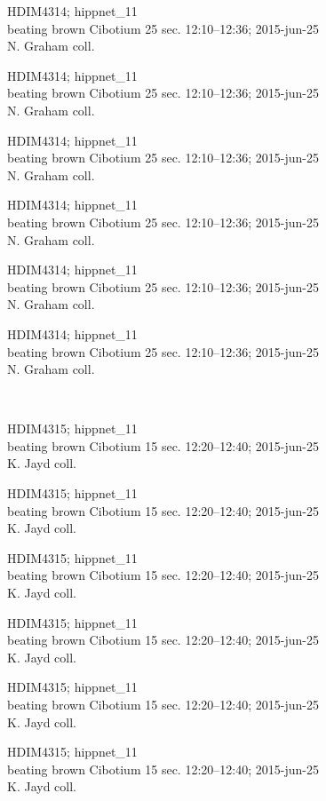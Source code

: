 \documentclass[2pt]{extarticle}
\begin{document}
\noindent
\parbox{0.16\textwidth}{\tiny \raggedright \rule[-0.3\baselineskip]{0pt}{10pt}HDIM4314; hippnet\_11\\ beating brown Cibotium 25 sec. 12:10--12:36; 2015-jun-25\\ N. Graham coll.}
\parbox{0.16\textwidth}{\tiny \raggedright \rule[-0.3\baselineskip]{0pt}{10pt}HDIM4314; hippnet\_11\\ beating brown Cibotium 25 sec. 12:10--12:36; 2015-jun-25\\ N. Graham coll.}
\parbox{0.16\textwidth}{\tiny \raggedright \rule[-0.3\baselineskip]{0pt}{10pt}HDIM4314; hippnet\_11\\ beating brown Cibotium 25 sec. 12:10--12:36; 2015-jun-25\\ N. Graham coll.}
\parbox{0.16\textwidth}{\tiny \raggedright \rule[-0.3\baselineskip]{0pt}{10pt}HDIM4314; hippnet\_11\\ beating brown Cibotium 25 sec. 12:10--12:36; 2015-jun-25\\ N. Graham coll.}
\parbox{0.16\textwidth}{\tiny \raggedright \rule[-0.3\baselineskip]{0pt}{10pt}HDIM4314; hippnet\_11\\ beating brown Cibotium 25 sec. 12:10--12:36; 2015-jun-25\\ N. Graham coll.}
\parbox{0.16\textwidth}{\tiny \raggedright \rule[-0.3\baselineskip]{0pt}{10pt}HDIM4314; hippnet\_11\\ beating brown Cibotium 25 sec. 12:10--12:36; 2015-jun-25\\ N. Graham coll.} \\ 
\vspace{0.001in} 

\noindent
\parbox{0.16\textwidth}{\tiny \raggedright \rule[-0.3\baselineskip]{0pt}{10pt}HDIM4315; hippnet\_11\\ beating brown Cibotium 15 sec. 12:20--12:40; 2015-jun-25\\ K. Jayd coll.}
\parbox{0.16\textwidth}{\tiny \raggedright \rule[-0.3\baselineskip]{0pt}{10pt}HDIM4315; hippnet\_11\\ beating brown Cibotium 15 sec. 12:20--12:40; 2015-jun-25\\ K. Jayd coll.}
\parbox{0.16\textwidth}{\tiny \raggedright \rule[-0.3\baselineskip]{0pt}{10pt}HDIM4315; hippnet\_11\\ beating brown Cibotium 15 sec. 12:20--12:40; 2015-jun-25\\ K. Jayd coll.}
\parbox{0.16\textwidth}{\tiny \raggedright \rule[-0.3\baselineskip]{0pt}{10pt}HDIM4315; hippnet\_11\\ beating brown Cibotium 15 sec. 12:20--12:40; 2015-jun-25\\ K. Jayd coll.}
\parbox{0.16\textwidth}{\tiny \raggedright \rule[-0.3\baselineskip]{0pt}{10pt}HDIM4315; hippnet\_11\\ beating brown Cibotium 15 sec. 12:20--12:40; 2015-jun-25\\ K. Jayd coll.}
\parbox{0.16\textwidth}{\tiny \raggedright \rule[-0.3\baselineskip]{0pt}{10pt}HDIM4315; hippnet\_11\\ beating brown Cibotium 15 sec. 12:20--12:40; 2015-jun-25\\ K. Jayd coll.} \\ 
\vspace{0.001in} 
\end{document}
